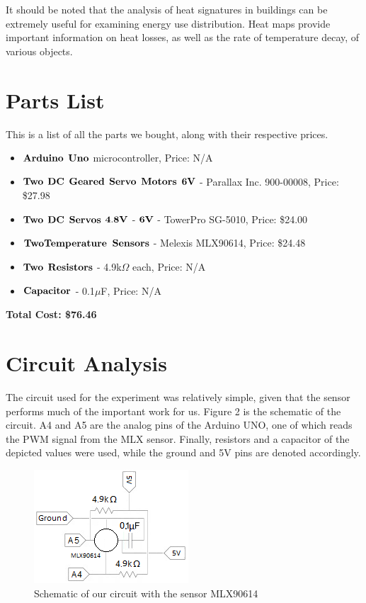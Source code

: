 \documentclass[11pt]{article}
\begin{document}
It should be noted that the analysis of heat signatures in buildings can be extremely useful for examining energy use distribution. Heat maps provide important information on heat losses, as well as the rate of temperature decay, of various objects.

\newpage
\section{Parts List}
This is a list of all the parts we bought, along with their respective prices.

\begin{itemize}
	\item $\bf Arduino$ $\bf Uno$ microcontroller, Price: N/A
	\item $\bf Two$ $\bf DC$ $\bf Geared$ $\bf Servo$ $\bf Motors$ $\bf 6V$ - Parallax Inc. 900-00008, Price: \$27.98
	\item $\bf Two$ $\bf DC$ $\bf Servos$ $\bf 4.8V$ - $\bf 6V$ - TowerPro SG-5010, Price: \$24.00
	\item $\bf Two Temperature$ $\bf Sensors$ - Melexis MLX90614, Price: \$24.48
	\item $\bf Two$ $\bf Resistors$ - 4.9k$\Omega$ each, Price: N/A
	\item $\bf Capacitor$ - 0.1$\mu$F, Price: N/A
\end{itemize}

\bf{Total Cost}: \$76.46

\section{Circuit Analysis}
\normalfont
The circuit used for the experiment was relatively simple, given that the sensor performs much of the important work for us.  Figure 2 is the schematic of the circuit. A4 and A5 are the analog pins of the Arduino UNO, one of which reads the PWM signal from the MLX sensor. Finally, resistors and a capacitor of the depicted values were used, while the ground and 5V pins are denoted accordingly.

\begin{figure}[!ht]
	\centering
	\includegraphics[width=.5\textwidth]{schematic}
	\caption{Schematic of our circuit with the sensor MLX90614}
	\label{fig:cover}
\end{figure}
\end{document}
